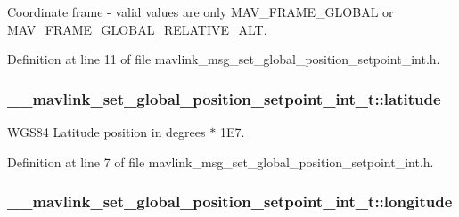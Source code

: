 Coordinate frame -\/ valid values are only M\-A\-V\-\_\-\-F\-R\-A\-M\-E\-\_\-\-G\-L\-O\-B\-A\-L or M\-A\-V\-\_\-\-F\-R\-A\-M\-E\-\_\-\-G\-L\-O\-B\-A\-L\-\_\-\-R\-E\-L\-A\-T\-I\-V\-E\-\_\-\-A\-L\-T. 



Definition at line 11 of file mavlink\-\_\-msg\-\_\-set\-\_\-global\-\_\-position\-\_\-setpoint\-\_\-int.\-h.

\hypertarget{struct____mavlink__set__global__position__setpoint__int__t_a5ce6831e10b85d86c1641ab5e1e7793f}{
\subsubsection[{latitude}]{ \-\_\-\-\_\-mavlink\-\_\-set\-\_\-global\-\_\-position\-\_\-setpoint\-\_\-int\-\_\-t\-::latitude}}\label{struct____mavlink__set__global__position__setpoint__int__t_a5ce6831e10b85d86c1641ab5e1e7793f}


W\-G\-S84 Latitude position in degrees $\ast$ 1\-E7. 



Definition at line 7 of file mavlink\-\_\-msg\-\_\-set\-\_\-global\-\_\-position\-\_\-setpoint\-\_\-int.\-h.

\hypertarget{struct____mavlink__set__global__position__setpoint__int__t_afe5579c39588820501f68c5114bf0902}{
\subsubsection[{longitude}]{ \-\_\-\-\_\-mavlink\-\_\-set\-\_\-global\-\_\-position\-\_\-setpoint\-\_\-int\-\_\-t\-::longitude}}\label{struct____mavlink__set__global__position__setpoint__int__t_afe5579c39588820501f68c5114bf0902}



